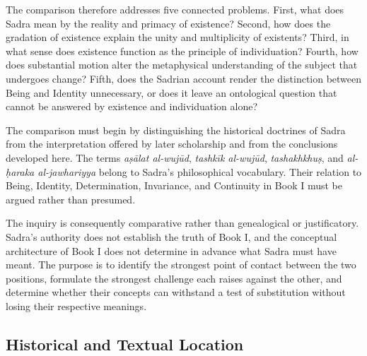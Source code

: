 \label{para:VS.B01.P01.C08.S17.SS01.P002}

The comparison therefore addresses five connected
problems. First, what does Sadra mean by the reality
and primacy of existence? Second, how does the
gradation of existence explain the unity and
multiplicity of existents? Third, in what sense does
existence function as the principle of individuation?
Fourth, how does substantial motion alter the
metaphysical understanding of the subject that
undergoes change? Fifth, does the Sadrian account
render the distinction between Being and Identity
unnecessary, or does it leave an ontological question
that cannot be answered by existence and individuation
alone?

\label{para:VS.B01.P01.C08.S17.SS01.P003}

The comparison must begin by distinguishing the
historical doctrines of Sadra from the interpretation
offered by later scholarship and from the conclusions
developed here. The terms \textit{aṣālat al-wujūd},
\textit{tashkīk al-wujūd}, \textit{tashakhkhuṣ}, and
\textit{al-ḥaraka al-jawhariyya} belong to Sadra's
philosophical vocabulary. Their relation to Being,
Identity, Determination, Invariance, and Continuity
in Book I must be argued rather than presumed.

\label{para:VS.B01.P01.C08.S17.SS01.P004}

The inquiry is consequently comparative rather than
genealogical or justificatory. Sadra's authority does
not establish the truth of Book I, and the conceptual
architecture of Book I does not determine in advance
what Sadra must have meant. The purpose is to identify
the strongest point of contact between the two
positions, formulate the strongest challenge each
raises against the other, and determine whether
their concepts can withstand a test of substitution
without losing their respective meanings.



\subsection{Historical and Textual Location}
\label{subsec:ch08_s17_ss02}

